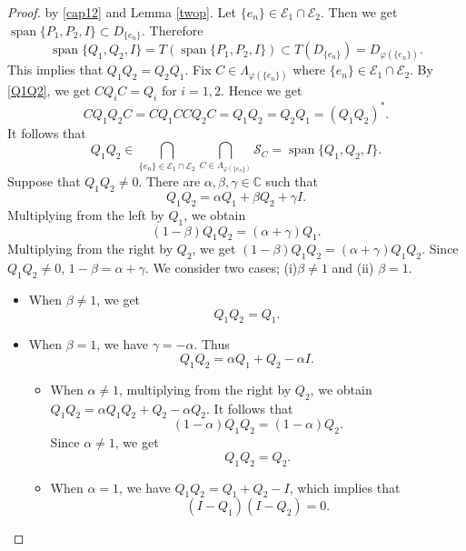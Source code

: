 \documentclass[11pt]{amsart}
\theoremstyle{remark}
\newcommand{\SC}{\mathcal{S}_C}
\newcommand{\Span}{\operatorname{span}}
\begin{document}
\begin{proof}

by \eqref{cap12} and Lemma \ref{twop}. 
Let $\{e_n\} \in \mathcal{E}_1 \cap \mathcal{E}_2$. Then we get $\Span\{ P_1, P_2, I\} \subset D_{\{e_n\}}$. Therefore 
\[
\Span\{ Q_1, Q_2, I\} =T(\Span\{ P_1, P_2, I\}) \subset T(D_{\{e_n\}})=D_{\varphi(\{e_n\})}.
\]
This implies that $Q_1Q_2=Q_2Q_1$. 
Fix $C \in \Lambda_{\varphi(\{e_n\})}$ where $\{e_n\} \in \mathcal{E}_1 \cap \mathcal{E}_2$. By \eqref{Q1Q2}, we get $CQ_iC=Q_i$ for $i=1,2$. Hence we get
\[
CQ_1Q_2C=CQ_1CCQ_2C=Q_1Q_2=Q_2Q_1=(Q_1Q_2)^*.
\]
It follows that 
\[
Q_1Q_2 \in \bigcap_{\{e_n\} \in \mathcal{E}_1 \cap \mathcal{E}_2}\bigcap_{C \in \Lambda_{\varphi(\{e_n\})}}\SC=\Span\{ Q_1, Q_2, I\}.
\]
Suppose that $Q_1Q_2 \neq 0$. There are $\alpha, \beta, \gamma \in \mathbb{C}$ such that
\[
Q_1Q_2=\alpha Q_1 +\beta Q_2+\gamma I.
\]
Multiplying from the left by $Q_1$, we obtain
\[
(1-\beta)Q_1Q_2=(\alpha+\gamma)Q_1.
\]
Multiplying from the right by $Q_2$, we get $(1-\beta)Q_1Q_2=(\alpha+\gamma)Q_1Q_2$. Since $Q_1Q_2 \neq 0$, $1-\beta=\alpha+\gamma$. We consider two cases; (i)$\beta \neq 1$ and (ii) $\beta =1$.\\
\begin{itemize}
\item[(i)]When $\beta \neq 1$, we get 
\[
Q_1Q_2=Q_1.
\]

\item[(ii)] When $\beta =1$, we have $\gamma=-\alpha$. Thus 
\[
Q_1Q_2=\alpha Q_1 + Q_2-\alpha I.
\]
\begin{itemize}
\item[(1)] When $\alpha \neq 1$, multiplying from the right by $Q_2$, we obtain $Q_1Q_2=\alpha Q_1Q_2 + Q_2-\alpha Q_2 $. It follows that
\[
(1-\alpha) Q_1Q_2=(1-\alpha) Q_2. 
\]
Since $\alpha \neq 1$, we get
\[
Q_1Q_2=Q_2.
\]
\item[(2)]When $\alpha =1$, we have $Q_1Q_2=Q_1 + Q_2- I $, which implies that
\[
(I-Q_1)(I-Q_2)=0.
\]
\end{itemize}
\end{itemize}
\end{proof}
\end{document}
